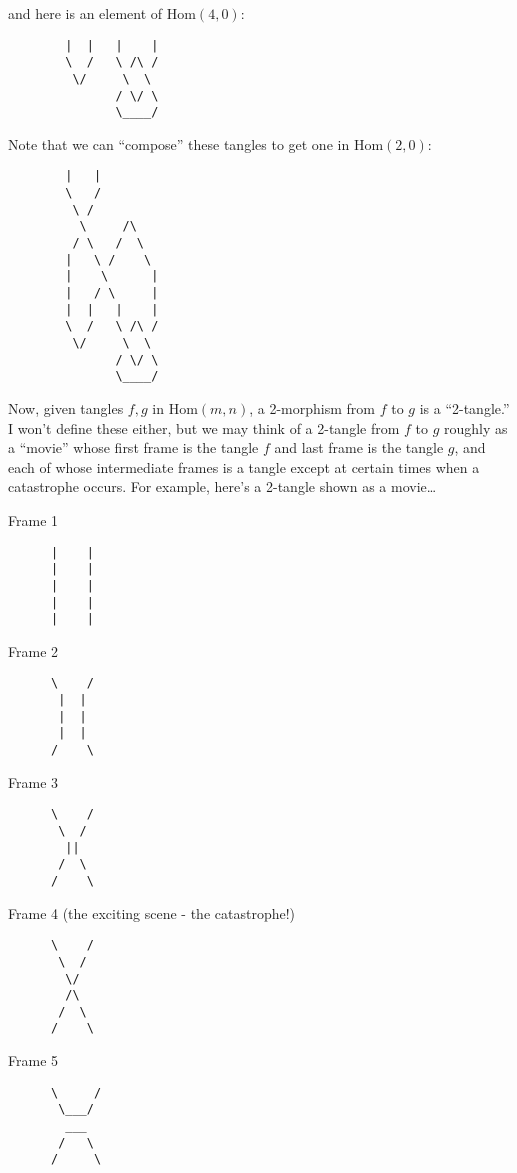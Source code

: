 \documentclass{article}
\begin{document}
and here is an element of \(\mathrm{Hom}(4,0)\):

\begin{verbatim}
        |  |   |    |
        \  /   \ /\ /
         \/     \  \
               / \/ \
               \____/
\end{verbatim}

Note that we can ``compose'' these tangles to get one in
\(\mathrm{Hom}(2,0)\):

\begin{verbatim}
        |   |
        \   /
         \ /
          \     /\
         / \   /  \
        |   \ /    \
        |    \      |
        |   / \     |
        |  |   |    |
        \  /   \ /\ /
         \/     \  \
               / \/ \
               \____/
\end{verbatim}

Now, given tangles \(f,g\) in \(\mathrm{Hom}(m,n)\), a 2-morphism from
\(f\) to \(g\) is a ``2-tangle.'' I won't define these either, but we
may think of a 2-tangle from \(f\) to \(g\) roughly as a ``movie'' whose
first frame is the tangle \(f\) and last frame is the tangle \(g\), and
each of whose intermediate frames is a tangle except at certain times
when a catastrophe occurs. For example, here's a 2-tangle shown as a
movie\ldots{}

Frame 1

\begin{verbatim}
      |    |
      |    |
      |    |
      |    |
      |    |
\end{verbatim}

Frame 2

\begin{verbatim}
      \    /
       |  |
       |  |
       |  |
      /    \
\end{verbatim}

Frame 3

\begin{verbatim}
      \    /
       \  /
        ||
       /  \
      /    \
\end{verbatim}

Frame 4 (the exciting scene - the catastrophe!)

\begin{verbatim}
      \    /
       \  /
        \/
        /\
       /  \
      /    \
\end{verbatim}

Frame 5

\begin{verbatim}
      \     /
       \___/
        ___
       /   \
      /     \
\end{verbatim}
\end{document}
